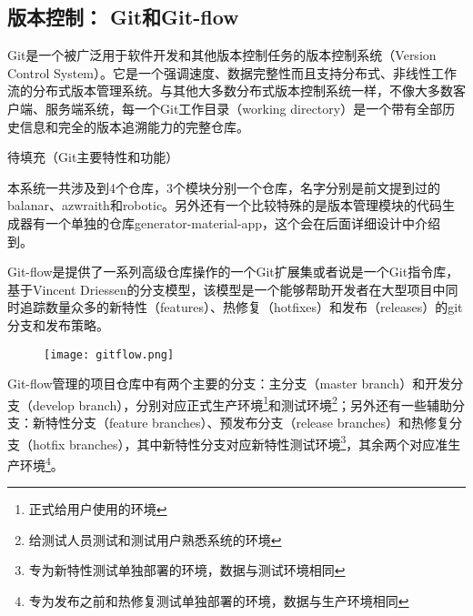 \subsection{版本控制： Git和Git-flow}
Git是一个被广泛用于软件开发和其他版本控制任务的版本控制系统（Version Control System）。它是一个强调速度、数据完整性而且支持分布式、非线性工作流的分布式版本管理系统。与其他大多数分布式版本控制系统一样，不像大多数客户端、服务端系统，每一个Git工作目录（working directory）是一个带有全部历史信息和完全的版本追溯能力的完整仓库。

待填充（Git主要特性和功能）

本系统一共涉及到4个仓库，3个模块分别一个仓库，名字分别是前文提到过的balanar、azwraith和robotic。另外还有一个比较特殊的是版本管理模块的代码生成器有一个单独的仓库generator-material-app，这个会在后面详细设计中介绍到。

Git-flow是提供了一系列高级仓库操作的一个Git扩展集或者说是一个Git指令库，基于Vincent Driessen的分支模型\supercite{driessen2010successful}，该模型是一个能够帮助开发者在大型项目中同时追踪数量众多的新特性（features）、热修复（hotfixes）和发布（releases）的git分支和发布策略。

\begin{figure}[!htp]
 \centering
 \texttt{[image: gitflow.png]}
\end{figure}

Git-flow管理的项目仓库中有两个主要的分支：主分支（master branch）和开发分支（develop branch），分别对应正式生产环境\footnote{正式给用户使用的环境}和测试环境\footnote{给测试人员测试和测试用户熟悉系统的环境}；另外还有一些辅助分支：新特性分支（feature branches）、预发布分支（release branches）和热修复分支（hotfix branches），其中新特性分支对应新特性测试环境\footnote{专为新特性测试单独部署的环境，数据与测试环境相同}，其余两个对应准生产环境\footnote{专为发布之前和热修复测试单独部署的环境，数据与生产环境相同}。

